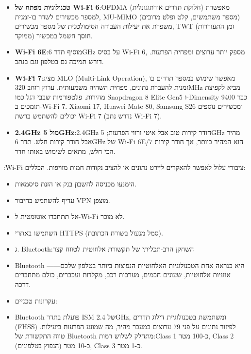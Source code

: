\begin{itemize}
  \item \textbf{טכנולוגיות מפתח של Wi-Fi 6}:OFDMA (חלוקת תדרים אורתוגונלית) מאפשרת למספר מכשירים לשדר בו-זמנית, MU-MIMO (מספר משתמשים, קלט ופלט מרובים) משפרת את יעילות העבודה הסימולטנית של מספר מכשירים, TWT (זמן התעוררות ממוקד) חוסך חשמל במכשיר.
  \item \textbf{Wi-Fi 6E}:מוסיף תדר 6GHz על בסיס Wi-Fi 6, מספק יותר ערוצים ומפחית הפרעות. דורש תמיכה גם בטלפון וגם בנתב.
  \item \textbf{Wi-Fi 7}:מציג MLO (Multi-Link Operation), מאפשר שימוש במספר תדרים בו זמנית להעברת נתונים, מפחית השהיה משמעותית. ערוץ רוחב 320MHz מביא לקפיצת מהירות. פלטפורמות שבבי דגל כמו Snapdragon 8 Elite Gen5 ו-Dimensity 9400 כבר תומכים ב-Wi-Fi 7. Xiaomi 17, Huawei Mate 80, Samsung S26 ומכשירים נוספים יכולים להשתמש ברשת Wi-Fi 7 (נדרש נתב Wi-Fi 7).
  \item \textbf{2.4GHz מול 5GHz}:2.4GHz חודר קירות טוב אבל איטי ורווי הפרעות; 5GHz מהיר אבל חודר קירות חלש. תדר 6GHz של Wi-Fi 6E/7 הוא המהיר ביותר, אך חודר קירות הכי חלש, מתאים לשימוש באותו חדר.
\end{itemize}


:Wi-Fi ציבורי עלול לאפשר להאקרים ליירט נתונים או להציב נקודות חמות מזויפות. הכללים:

\begin{itemize}
  \item הימנעו מכניסה לחשבון בנק או הזנת סיסמאות.
  \item עדיף להשתמש בחיבור VPN מוצפן.
  \item אל תתחברו אוטומטית ל-Wi-Fi לא מוכר.
  \item השתמשו באתרי HTTPS (סמל מנעול בשורת הכתובת).
\end{itemize}

\begin{itemize}
  \item ג. Bluetooth:השחקן הרב-תכליתי של תקשורת אלחוטית לטווח קצר
  \item Bluetooth היא כנראה אחת הטכנולוגיות האלחוטיות הנפוצות ביותר בטלפון שלכם——אוזניות אלחוטיות, שעונים חכמים, מערכות רכב, מקלדות ועכברים, כולם מתחברים דרכה.
  \item עקרונות טכניים:
  \item Bluetooth פועלת בתדר ISM של 2.4GHz, ומשתמשת בטכנולוגיית דילוג תדרים (FHSS) לפיזור נתונים על פני 79 ערוצים במעבר מהיר, מה שמונע הפרעות ביעילות. טווח התקשורת של Bluetooth מתחלק לשלוש רמות:Class 1 כ-100 מטר, Class 2 כ-10 מטר (הנפוץ בטלפונים), Class 3 כ-1 מטר.
\end{itemize}

